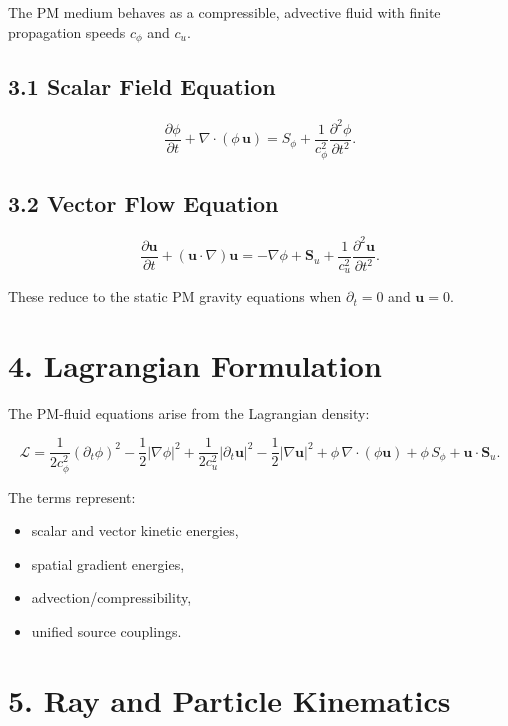 \documentclass{article}
\begin{document}
The PM medium behaves as a compressible, advective fluid with finite
propagation speeds $c_\phi$ and $c_u$.

\subsection*{3.1 Scalar Field Equation}



\[
\frac{\partial \phi}{\partial t}
+ \nabla\cdot(\phi\,\mathbf u)
=
S_\phi
+
\frac{1}{c_\phi^2}\frac{\partial^2 \phi}{\partial t^2}.
\]



\subsection*{3.2 Vector Flow Equation}



\[
\frac{\partial \mathbf u}{\partial t}
+ (\mathbf u\cdot\nabla)\mathbf u
=
-\nabla \phi
+ \mathbf S_u
+ \frac{1}{c_u^2}\frac{\partial^2 \mathbf u}{\partial t^2}.
\]



These reduce to the static PM gravity equations when $\partial_t = 0$ and
$\mathbf u = 0$.

\section*{4. Lagrangian Formulation}

The PM-fluid equations arise from the Lagrangian density:



\[
\mathcal{L}
=
\frac{1}{2c_\phi^2}(\partial_t \phi)^2
- \frac{1}{2}|\nabla \phi|^2
+
\frac{1}{2c_u^2}|\partial_t \mathbf u|^2
- \frac{1}{2}|\nabla \mathbf u|^2
+
\phi\,\nabla\cdot(\phi\mathbf u)
+
\phi\,S_\phi
+
\mathbf u\cdot\mathbf S_u.
\]



The terms represent:

\begin{itemize}
    \item scalar and vector kinetic energies,
    \item spatial gradient energies,
    \item advection/compressibility,
    \item unified source couplings.
\end{itemize}

\section*{5. Ray and Particle Kinematics}
\end{document}
